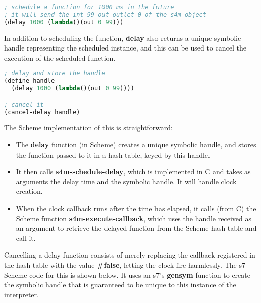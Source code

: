 \documentclass[acmsmall]{acmart}
\begin{document}
\begin{lstlisting}[language=lisp]
; schedule a function for 1000 ms in the future
; it will send the int 99 out outlet 0 of the s4m object
(delay 1000 (lambda()(out 0 99)))
\end{lstlisting}

In addition to scheduling the function, \textbf{delay} also returns a unique
symbolic handle representing the scheduled instance, and this can be used to 
cancel the execution of the scheduled function.

\begin{lstlisting}[language=lisp]
; delay and store the handle
(define handle 
  (delay 1000 (lambda()(out 0 99))))

; cancel it
(cancel-delay handle)
\end{lstlisting}

The Scheme implementation of this is straightforward:

\begin{itemize}
\item The \textbf{delay} function (in Scheme) creates a unique symbolic handle, and stores the 
  function passed to it in a hash-table, keyed by this handle.
\item It then calls \textbf{s4m-schedule-delay}, which is implemented
  in C and takes as arguments the delay time and the symbolic handle. It will handle 
  clock creation.
\item When the clock callback runs after the time has elapsed, it calls (from C) the Scheme function 
  \textbf{s4m-execute-callback}, which uses the handle received as an argument 
  to retrieve the delayed function from the Scheme hash-table and call it.
\end{itemize}

Cancelling a delay function consists of merely replacing the callback registered
in the hash-table with the value \textbf{\#false}, letting the clock fire harmlessly.
The s7 Scheme code for this is shown below. It uses an s7's \textbf{gensym} function to create the
symbolic handle that is guaranteed to be unique to this instance of the interpreter.
\end{document}
